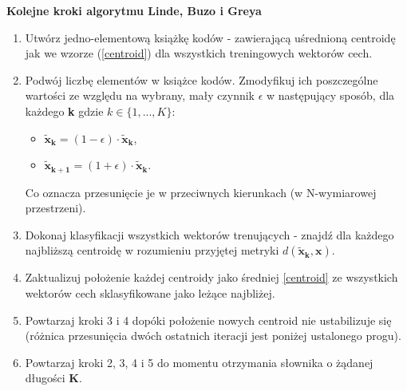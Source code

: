 \textbf{Kolejne kroki algorytmu Linde, Buzo i Greya\cite{minidsp}}
\begin{enumerate}
    \item Utwórz jedno-elementową książkę kodów - zawierającą uśrednioną centroidę jak we wzorze (\ref{centroid}) dla wszystkich treningowych wektorów cech.
  \item Podwój liczbę elementów w książce kodów. Zmodyfikuj ich poszczególne wartości ze względu na wybrany, mały czynnik $\epsilon$ w następujący sposób, dla każdego \textbf{k} gdzie \textbf{$ k \in \{1,...,K\}$}:
    \begin{itemize}
      \item $ \bm{\tilde{x}_k} = (1 - \epsilon) \cdot \bm{\tilde{x}_k} $,
      \item $ \bm{\tilde{x}_{k+1}} = (1 + \epsilon) \cdot \bm{\tilde{x}_k} $.
    \end{itemize}
    Co oznacza przesunięcie je w przeciwnych kierunkach (w N-wymiarowej przestrzeni).
  \item Dokonaj klasyfikacji wszystkich wektorów trenujących - znajdź dla każdego najbliższą centroidę w rozumieniu przyjętej metryki $ d(\bm{\tilde{x}_k}, \bm{x})$. 
  \item Zaktualizuj położenie każdej centroidy jako średniej \ref{centroid} ze wszystkich wektorów cech sklasyfikowane jako leżące najbliżej.
  \item Powtarzaj kroki 3 i 4 dopóki położenie nowych centroid nie ustabilizuje się (różnica przesunięcia dwóch ostatnich iteracji jest poniżej ustalonego progu).
  \item Powtarzaj kroki 2, 3, 4 i 5 do momentu otrzymania słownika o żądanej długości \textbf{K}.
\end{enumerate}


